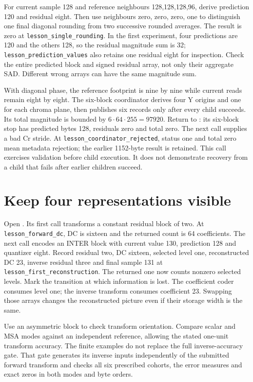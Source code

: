 For current sample 128 and reference neighbours 128,128,128,96, derive prediction
120 and residual eight. Then use neighbours zero, zero, zero, one to distinguish
one final diagonal rounding from two successive rounded averages. The result is
zero at \texttt{lesson\_single\_rounding}. In the first experiment, four
predictions are 120 and the others 128, so the residual magnitude sum is 32;
\texttt{lesson\_prediction\_values} also retains one residual eight for inspection.
Check the entire predicted block and signed residual array, not only their
aggregate SAD. Different wrong arrays can have the same magnitude sum.

With diagonal phase, the reference footprint is nine by nine while current reads
remain eight by eight. The six-block coordinator derives four Y origins and one
for each chroma plane, then publishes six records only after every child succeeds.
Its total magnitude is bounded by $6\cdot64\cdot255=97920$. Return to : its six-block stop has predicted
bytes 128, residuals zero and total zero. The next call supplies a bad Cr stride.
At \texttt{lesson\_coordinator\_rejected}, status one and total zero mean
metadata rejection; the earlier 1152-byte result is retained. This call exercises
validation before child execution. It does not demonstrate recovery from a child
that fails after earlier children succeed.

\section{Keep four representations visible}

Open . Its first call transforms a
constant residual block of two. At \texttt{lesson\_forward\_dc}, DC is sixteen
and the returned count is 64 coefficients. The next call encodes an INTER block
with current value 130, prediction 128 and quantizer eight.
Record residual two, DC sixteen, selected level one, reconstructed DC 23, inverse
residual three and final sample 131 at
\texttt{lesson\_first\_reconstruction}. The returned one now counts nonzero
selected levels. Mark the transition at which information is
lost. The coefficient coder consumes level one; the inverse transform consumes
coefficient 23. Swapping those arrays changes the reconstructed picture even if
their storage width is the same.

Use an asymmetric block to check transform orientation. Compare scalar and MSA
modes against an independent reference, allowing the stated one-unit transform
accuracy. The finite examples do not replace the full inverse-accuracy gate.
That gate generates its inverse inputs independently of the submitted forward
transform and checks all six prescribed cohorts, the error measures and exact
zeros in both modes and byte orders.

